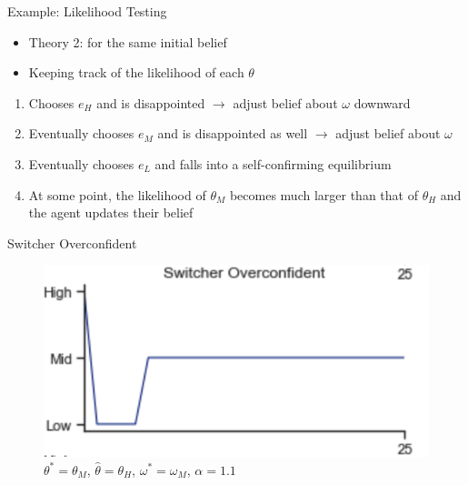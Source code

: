 \documentclass[aspectratio=169]{beamer}
\begin{document}
\begin{frame}{Example: Likelihood Testing}
\begin{itemize}
    \item Theory 2: for the same initial belief
    \item Keeping track of the likelihood of each $\theta$
    \end{itemize}
    \bigskip
    \begin{enumerate}
        \item Chooses $e_H$ and is disappointed $\rightarrow$ adjust belief about $\omega$ downward\\
        \bigskip
        \item Eventually chooses $e_M$ and is disappointed as well $\rightarrow$ adjust belief about $\omega$\\
        \bigskip
        \item Eventually chooses $e_L$ and falls into a self-confirming equilibrium\\
        \bigskip
        \item At some point, the likelihood of $\theta_M$ becomes much larger than that of $\theta_H$ and the agent updates their belief
    \end{enumerate}
    
    
\end{frame}

\begin{frame}{Switcher Overconfident}
    \begin{figure}
        \centering
        \includegraphics{figures/switch.png}
        \caption{$\theta^*=\theta_M$, $\hat\theta=\theta_H$, $\omega^*=\omega_M$, $\alpha= 1.1$}
    \end{figure}
\end{frame}
\end{document}

